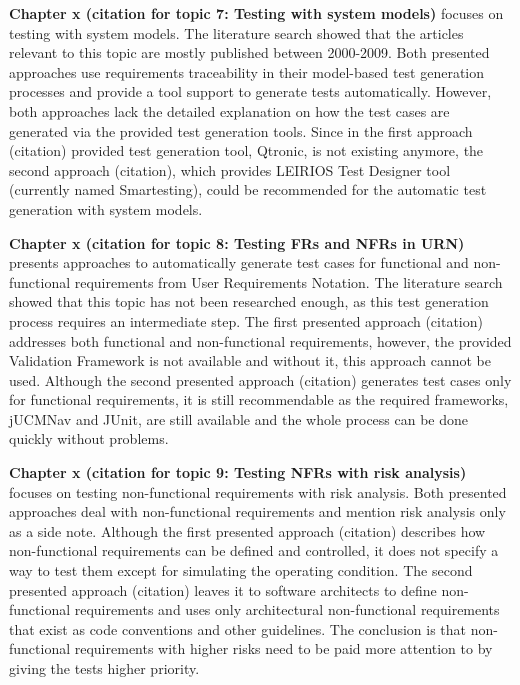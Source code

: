 \textbf{Chapter x (citation for topic 7: Testing with system models)} focuses on testing with system models. The literature search showed that the articles relevant to this topic are mostly published between 2000-2009. Both presented approaches use requirements traceability in their model-based test generation processes and provide a tool support to generate tests automatically. However, both approaches lack the detailed explanation on how the test cases are generated via the provided test generation tools. Since in the first approach (citation) provided test generation tool, Qtronic, is not existing anymore, the second approach (citation), which provides LEIRIOS Test Designer tool (currently named Smartesting), could be recommended for the automatic test generation with system models.

\textbf{Chapter x (citation for topic 8: Testing FRs and NFRs in URN)} presents approaches to automatically generate test cases for functional and non-functional requirements from User Requirements Notation. The literature search showed that this topic has not been researched enough, as this test generation process requires an intermediate step. The first presented approach (citation) addresses both functional and non-functional requirements, however, the provided Validation Framework is not available and without it, this approach cannot be used. Although the second presented approach (citation) generates test cases only for functional requirements, it is still recommendable as the required frameworks, jUCMNav and JUnit, are still available and the whole process can be done quickly without problems. 

\textbf{Chapter x (citation for topic 9: Testing NFRs with risk analysis)} focuses on testing non-functional requirements with risk analysis. Both presented approaches deal with non-functional requirements and mention risk analysis only as a side note. Although the first presented approach (citation) describes how non-functional requirements can be defined and controlled, it does not specify a way to test them except for simulating the operating condition. The second presented approach (citation) leaves it to software architects to define non-functional requirements and uses only architectural non-functional requirements that exist as code conventions and other guidelines. The conclusion is that non-functional requirements with higher risks need to be paid more attention to by giving the tests higher priority.

